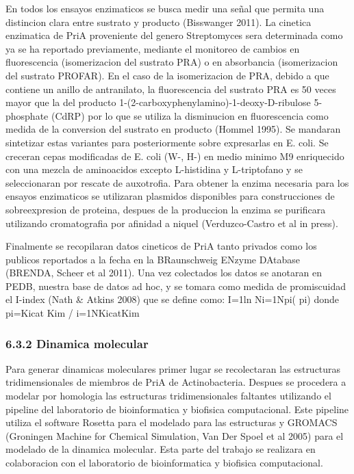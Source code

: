 \documentclass[12pt,twoside]{reedthesis}
\begin{document}
  En todos los ensayos enzimaticos se busca medir una señal que permita
  una distincion clara entre sustrato y producto (Bisswanger 2011). La
  cinetica enzimatica de PriA proveniente del genero Streptomyces sera
  determinada como ya se ha reportado previamente, mediante el monitoreo
  de cambios en fluorescencia (isomerizacion del sustrato PRA) o en
  absorbancia (isomerizacion del sustrato PROFAR). En el caso de la
  isomerizacion de PRA, debido a que contiene un anillo de antranilato, la
  fluorescencia del sustrato PRA es 50 veces mayor que la del producto
  1-(2-carboxyphenylamino)-1-deoxy-D-ribulose 5-phosphate (CdRP) por lo
  que se utiliza la disminucion en fluorescencia como medida de la
  conversion del sustrato en producto (Hommel 1995). Se mandaran
  sintetizar estas variantes para posteriormente sobre expresarlas en E.
  coli. Se creceran cepas modificadas de E. coli (W-, H-) en medio minimo
  M9 enriquecido con una mezcla de aminoacidos excepto L-histidina y
  L-triptofano y se seleccionaran por rescate de auxotrofia. Para obtener
  la enzima necesaria para los ensayos enzimaticos se utilizaran plasmidos
  disponibles para construcciones de sobreexpresion de proteina, despues
  de la produccion la enzima se purificara utilizando cromatografia por
  afinidad a niquel (Verduzco-Castro et al in press).
  
  Finalmente se recopilaran datos cineticos de PriA tanto privados como
  los publicos reportados a la fecha en la BRaunschweig ENzyme DAtabase
  (BRENDA, Scheer et al 2011). Una vez colectados los datos se anotaran en
  PEDB, nuestra base de datos ad hoc, y se tomara como medida de
  promiscuidad el I-index (Nath \& Atkins 2008) que se define como: I=1ln
  Ni=1Npi( pi) donde pi=Kicat Kim / i=1NKicatKim
  
  \subsubsection{6.3.2 Dinamica molecular}\label{dinamica-molecular}
  
  Para generar dinamicas moleculares primer lugar se recolectaran las
  estructuras tridimensionales de miembros de PriA de Actinobacteria.
  Despues se procedera a modelar por homologia las estructuras
  tridimensionales faltantes utilizando el pipeline del laboratorio de
  bioinformatica y biofisica computacional. Este pipeline utiliza el
  software Rosetta para el modelado para las estructuras y GROMACS
  (Groningen Machine for Chemical Simulation, Van Der Spoel et al 2005)
  para el modelado de la dinamica molecular. Esta parte del trabajo se
  realizara en colaboracion con el laboratorio de bioinformatica y
  biofisica computacional.
  
\end{document}

